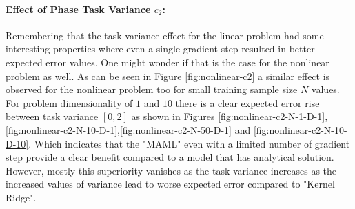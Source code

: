 \paragraph{Effect of Phase Task Variance $c_2$:} Remembering that the task variance effect for the linear problem had some interesting properties where even a single gradient step resulted in better expected error values. One might wonder if that is the case for the nonlinear problem as well. As can be seen in Figure \ref{fig:nonlinear-c2} a similar effect is observed for the nonlinear problem too for small training sample size $N$ values. For problem dimensionality of $1$ and  $10$ there is a clear expected error rise between task variance $[0,2]$ as shown in Figures \ref{fig:nonlinear-c2-N-1-D-1},\ref{fig:nonlinear-c2-N-10-D-1},\ref{fig:nonlinear-c2-N-50-D-1} and \ref{fig:nonlinear-c2-N-10-D-10}. Which indicates that the "MAML" even with a limited number of gradient step provide a clear benefit compared to a model that has analytical solution. However, mostly this superiority vanishes as the task variance increases as the increased values of variance lead to worse expected error compared to "Kernel Ridge".

